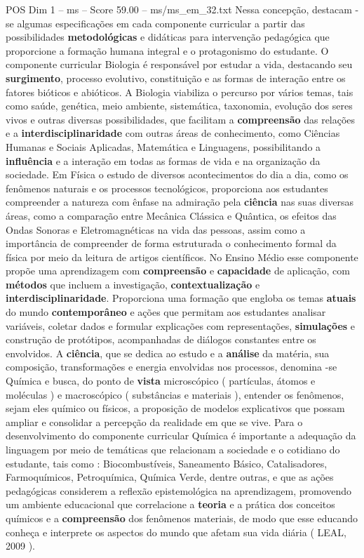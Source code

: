 \begin{textsample}{POS Dim 1 – ms – Score 59.00 – ms/ms\_em\_32.txt}
Nessa concepção, destacam -se algumas especificações em cada componente curricular a partir das possibilidades \textbf{metodológicas} e didáticas para intervenção pedagógica que proporcione a formação humana integral e o protagonismo do estudante.
O componente curricular Biologia é responsável por estudar a vida, destacando seu \textbf{surgimento}, processo evolutivo, constituição e as formas de interação entre os fatores bióticos e abióticos.
A Biologia viabiliza o percurso por vários temas, tais como saúde, genética, meio ambiente, sistemática, taxonomia, evolução dos seres vivos e outras diversas possibilidades, que facilitam a \textbf{compreensão} das relações e a \textbf{interdisciplinaridade} com outras áreas de conhecimento, como Ciências Humanas e Sociais Aplicadas, Matemática e Linguagens, possibilitando a \textbf{influência} e a interação em todas as formas de vida e na organização da sociedade.
Em Física o estudo de diversos acontecimentos do dia a dia, como os fenômenos naturais e os processos tecnológicos, proporciona aos estudantes compreender a natureza com ênfase na admiração pela \textbf{ciência} nas suas diversas áreas, como a comparação entre Mecânica Clássica e Quântica, os efeitos das Ondas Sonoras e Eletromagnéticas na vida das pessoas, assim como a importância de compreender de forma estruturada o conhecimento formal da física por meio da leitura de artigos científicos.
No Ensino Médio esse componente propõe uma aprendizagem com \textbf{compreensão} e \textbf{capacidade} de aplicação, com \textbf{métodos} que incluem a investigação, \textbf{contextualização} e \textbf{interdisciplinaridade}.
Proporciona uma formação que engloba os temas \textbf{atuais} do mundo \textbf{contemporâneo} e ações que permitam aos estudantes analisar variáveis, coletar dados e formular explicações com representações, \textbf{simulações} e construção de protótipos, acompanhadas de diálogos constantes entre os envolvidos.
A \textbf{ciência}, que se dedica ao estudo e a \textbf{análise} da matéria, sua composição, transformações e energia envolvidas nos processos, denomina -se Química e busca, do ponto de \textbf{vista} microscópico ( partículas, átomos e moléculas ) e macroscópico ( substâncias e materiais ), entender os fenômenos, sejam eles químico ou físicos, a proposição de modelos explicativos que possam ampliar e consolidar a percepção da realidade em que se vive.
Para o desenvolvimento do componente curricular Química é importante a adequação da linguagem por meio de temáticas que relacionam a sociedade e o cotidiano do estudante, tais como : Biocombustíveis, Saneamento Básico, Catalisadores, Farmoquímicos, Petroquímica, Química Verde, dentre outras, e que as ações pedagógicas considerem a reflexão epistemológica na aprendizagem, promovendo um ambiente educacional que correlacione a \textbf{teoria} e a prática dos conceitos químicos e a \textbf{compreensão} dos fenômenos materiais, de modo que esse educando conheça e interprete os aspectos do mundo que afetam sua vida diária ( LEAL, 2009 ).

\end{textsample}
